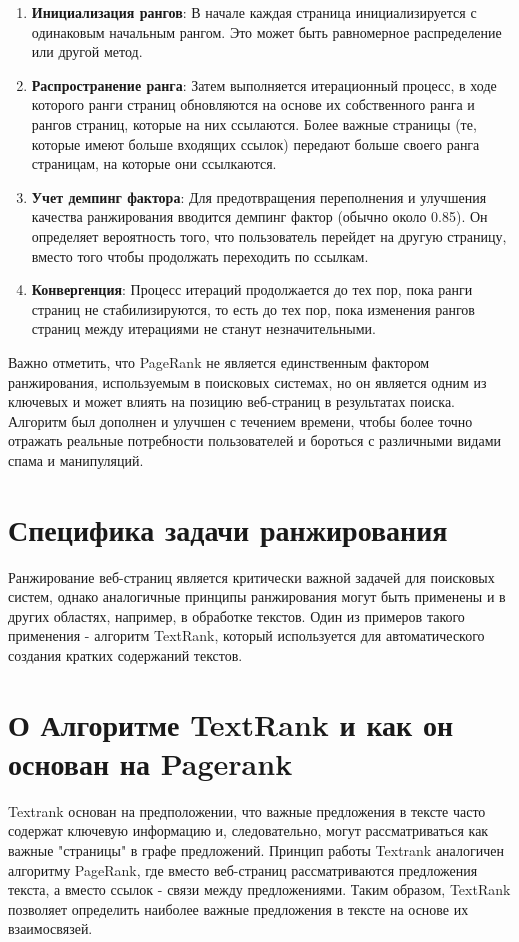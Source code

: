 \documentclass[a4paper]{article}
\begin{document}
\begin{enumerate}
	\item \textbf{Инициализация рангов}: В начале каждая страница инициализируется с одинаковым начальным рангом. Это может быть равномерное распределение или другой метод.
	\item \textbf{Распространение ранга}: Затем выполняется итерационный процесс, в ходе которого ранги страниц обновляются на основе их собственного ранга и рангов страниц, которые на них ссылаются. Более важные страницы (те, которые имеют больше входящих ссылок) передают больше своего ранга страницам, на которые они ссылкаются.
	\item \textbf{Учет демпинг фактора}: Для предотвращения переполнения и улучшения качества ранжирования вводится демпинг фактор (обычно около 0.85). Он определяет вероятность того, что пользователь перейдет на другую страницу, вместо того чтобы продолжать переходить по ссылкам.
	\item \textbf{Конвергенция}: Процесс итераций продолжается до тех пор, пока ранги страниц не стабилизируются, то есть до тех пор, пока изменения рангов страниц между итерациями не станут незначительными.
\end{enumerate}

Важно отметить, что PageRank не является единственным фактором ранжирования, используемым в поисковых системах, но он является одним из ключевых и может влиять на позицию веб-страниц в результатах поиска. Алгоритм был дополнен и улучшен с течением времени, чтобы более точно отражать реальные потребности пользователей и бороться с различными видами спама и манипуляций.

	
\section{Специфика задачи ранжирования}

Ранжирование веб-страниц является критически важной задачей для поисковых систем, однако аналогичные принципы ранжирования могут быть применены и в других областях, например, в обработке текстов. Один из примеров такого применения - алгоритм TextRank, который используется для автоматического создания кратких содержаний текстов.

\section{О Алгоритме TextRank и как он основан на Pagerank}

Textrank основан на предположении, что важные предложения в тексте часто содержат ключевую информацию и, следовательно, могут рассматриваться как важные "страницы" в графе предложений. Принцип работы Textrank аналогичен алгоритму PageRank, где вместо веб-страниц рассматриваются предложения текста, а вместо ссылок - связи между предложениями. Таким образом, TextRank позволяет определить наиболее важные предложения в тексте на основе их взаимосвязей.
\end{document}

